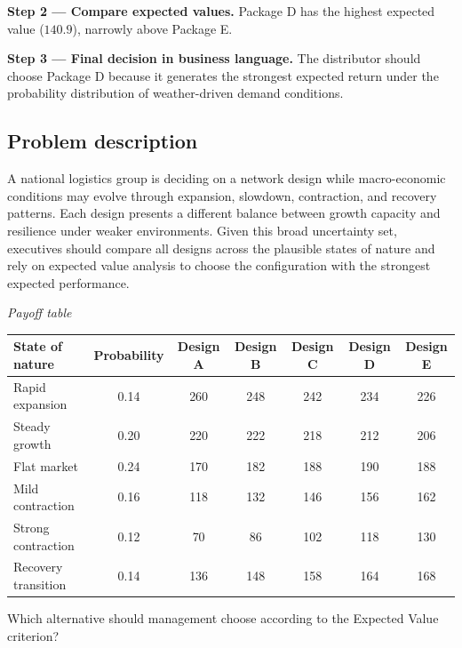 \begin{ExamProblems}
		\textbf{Step 2 --- Compare expected values.}
		Package D has the highest expected value ($140.9$), narrowly above Package E.
		
		\textbf{Step 3 --- Final decision in business language.}
		The distributor should choose Package D because it generates the strongest expected return under the probability distribution of weather-driven demand conditions.		\item
		\subsection*{Problem description}
		A national logistics group is deciding on a network design while macro-economic conditions may evolve through expansion, slowdown, contraction, and recovery patterns. Each design presents a different balance between growth capacity and resilience under weaker environments. Given this broad uncertainty set, executives should compare all designs across the plausible states of nature and rely on expected value analysis to choose the configuration with the strongest expected performance.

		\begin{center}
			\textit{Payoff table}
			\begin{tabular}{l c c c c c c}
				\toprule
				State of nature & Probability & Design A & Design B & Design C & Design D & Design E \\
				\midrule
				Rapid expansion & 0.14 & 260 & 248 & 242 & 234 & 226 \\
				Steady growth & 0.20 & 220 & 222 & 218 & 212 & 206 \\
				Flat market & 0.24 & 170 & 182 & 188 & 190 & 188 \\
				Mild contraction & 0.16 & 118 & 132 & 146 & 156 & 162 \\
				Strong contraction & 0.12 & 70 & 86 & 102 & 118 & 130 \\
				Recovery transition & 0.14 & 136 & 148 & 158 & 164 & 168 \\
				\bottomrule
			\end{tabular}
		\end{center}

		Which alternative should management choose according to the Expected Value criterion?


\end{ExamProblems}
